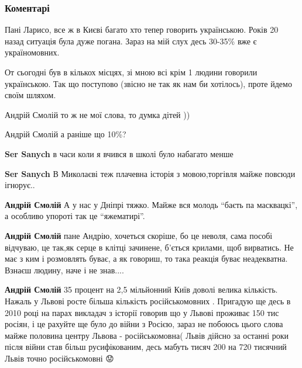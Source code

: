  
 
 
 
 
\subsubsection{Коментарі}

\begin{itemize}


Пані Ларисо, все ж в Києві багато хто тепер говорить українською. Років 20
назад ситуація була дуже погана. Зараз на мій слух десь 30-35\% вже є
україномовних.

От сьогодні був в кількох місцях, зі мною всі крім 1 людини говорили
українською.  Так що поступово (звісно не так як нам би хотілось), проте йдемо
своїм шляхом.


Андрій Смолій то ж не мої слова, то думка дітей ))


Андрій Смолій а раніше що 10\%?

\textbf{Ser Sanych} в часи коли я вчився в школі було набагато менше

\textbf{Ser Sanych} В Миколаєві теж плачевна історія з мовою,торгівля майже повсюди ігнорує..

\textbf{Андрій Смолій} А у нас у Дніпрі тяжко. Майже вся молодь \enquote{баєть
па масквацкі}, а особливо упороті так це \enquote{яжематирі}.


\textbf{Андрій Смолій} пане Андрію, хочеться скоріше, бо це неволя, сама пособі
відчуваю, це так,як серце в клітці зачинене, б'ється крилами, щоб вирватись.
Не має з ким і розмовлять буває, а як говориш, то така реакція буває
неадекватна.  Взнаєш людину, наче і не знав....


\textbf{Андрій Смолій} 35 процент на 2,5 мільйонний Київ доволі велика
кількість. Нажаль у Львові росте більша кількість російськомовних . Пригадую ще
десь в 2010 році на парах викладач з історії говорив що у Львові проживає 150
тис росіян, і це рахуйте ще було до війни з Росією, зараз не побоюсь цього
слова майже половина центру Львова - російськомовна( Львів дійсно за останні
роки після війни став більш русифікованим, десь мабуть тисяч 200 на 720
тисячний Львів точно російськомовні 😟


\end{itemize}
